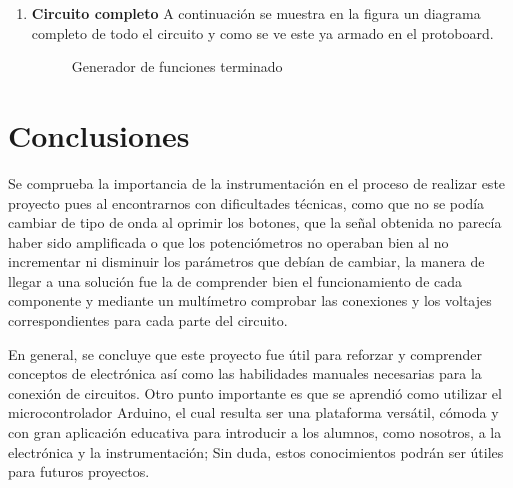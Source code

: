 \documentclass[11pt]{article}
\begin{document}
\begin{enumerate}[label=\textbf{Paso \arabic*:}]
\item \textbf{Circuito completo}
A continuación se muestra en la figura un diagrama completo de todo el circuito y como se ve este ya armado en el protoboard.

\begin{figure}[H]
\centering
{}
\caption{Generador de funciones terminado}
\label{fig:arduino}
\end{figure}
\end{enumerate}





\section{Conclusiones}
Se comprueba la importancia de la instrumentación en el proceso de realizar este proyecto pues al encontrarnos con dificultades técnicas, como que no se podía cambiar de tipo de onda al oprimir los botones, que la señal obtenida no parecía haber sido amplificada o que los potenciómetros no operaban bien al no incrementar ni disminuir los parámetros que debían de cambiar, la manera de llegar a una solución fue la de comprender bien el funcionamiento de cada componente y mediante un multímetro comprobar las conexiones y los voltajes correspondientes para cada parte del circuito.

En general, se concluye que este proyecto fue útil para reforzar y comprender conceptos de electrónica así como las habilidades manuales necesarias para la conexión de circuitos. Otro punto importante es que se aprendió como utilizar el microcontrolador Arduino, el cual resulta ser una plataforma versátil, cómoda y con gran aplicación educativa para introducir a los alumnos, como nosotros, a la electrónica y la instrumentación; Sin duda, estos conocimientos podrán ser útiles para futuros proyectos.
\end{document}
